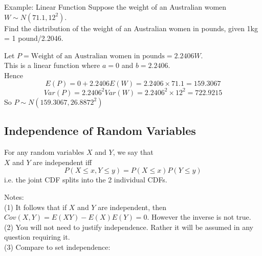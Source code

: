 \documentclass[t,xcolor=pdftex,dvipsnames,table]{beamer}
\begin{document}
\begin{frame}[fragile]\frametitle{}

\begin{block}{Example: Linear Function}
Suppose the weight of an Australian women $W \sim N(71.1, 12^2)$.
\href{http://www.abs.gov.au/ausstats/abs@.nsf/0/E11CED5FB86D178ACA257AA30014C059?opendocument}{} \\
Find the distribution of the weight of an Australian women in pounds, given 1kg = 1 pound/2.2046.
\end{block}

\vspace{.5cm}
Let $P = \mbox{Weight of an Australian women in pounds} = 2.2406 W$. \\

This is a linear function where $a=0$ and $b= 2.2406$. \\

Hence 
\[ E(P) = 0 + 2.2406 E(W) = 2.2406 \times 71.1 =  159.3067 \]
\[ Var(P) = 2.2406^2 Var(W) = 2.2406^2 \times 12^2 = 722.9215 \]
So $P \sim N(159.3067, 26.8872^2)$
\end{frame}




\subsection[Independence]{Independence of Random Variables}

\begin{frame}{}
\begin{definition}
For any random variables $X$ and $Y$, we say that \\
$X$ and $Y$ are independent
iff
\[ P(X \leq x, Y \leq y) = P(X \leq x) P(Y \leq y) \]
i.e. the joint CDF splits into the 2 individual CDFs.
\end{definition}

\vspace{.5cm}
Notes: \\
(1) 
It follows that if $X$ and $Y$ are independent, then $Cov(X,Y) = E(XY) - E(X)E(Y) = 0$. However the inverse is not true. \\
(2) You will not need to justify independence. Rather it will be assumed in any question requiring it. \\
(3) Compare to set independence:
\hyperlink{Setindependence}{}
\end{frame}
\end{document}
